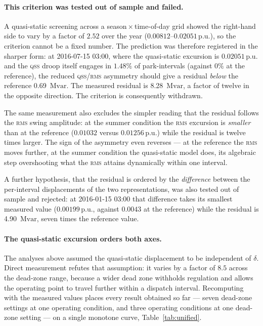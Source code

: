 \documentclass[11pt,a4paper]{article}
\newcommand{\pu}{\ensuremath{\mathrm{p.u.}}}
\newcommand{\Mvar}{\ensuremath{\mathrm{Mvar}}}
\newcommand{\qss}{\textsc{qss}}
\newcommand{\rms}{\textsc{rms}}
\begin{document}
\paragraph{This criterion was tested out of sample and failed.} A
quasi-static screening across a season\,$\times$\,time-of-day grid showed the
right-hand side to vary by a factor of $2.52$ over the year
($0.00812$--$0.02051\,\pu$), so the criterion cannot be a fixed number. The
prediction was therefore registered in the sharper form: at
2016-07-15 03:00, where the quasi-static excursion is $0.02051\,\pu$ and the
\qss{} droop itself engages in $1.48\%$ of park-intervals (against $0\%$ at
the reference), the reduced \qss/\rms{} asymmetry should give a residual
\emph{below} the reference \SI{0.69}{\Mvar}. The measured residual is
\SI{8.28}{\Mvar}, a factor of twelve in the opposite direction. The criterion
is consequently withdrawn.

The same measurement also excludes the simpler reading that the residual
follows the \rms{} swing amplitude: at the summer condition the \rms{}
excursion is \emph{smaller} than at the reference ($0.01032$ versus
$0.01256\,\pu$) while the residual is twelve times larger. The sign of the
asymmetry even reverses --- at the reference the \rms{} moves further, at the
summer condition the quasi-static model does, its algebraic step overshooting
what the \rms{} attains dynamically within one interval.

A further hypothesis, that the residual is ordered by the \emph{difference}
between the per-interval displacements of the two representations, was also
tested out of sample and rejected: at 2016-01-15 03:00 that difference takes
its smallest measured value ($0.00199\,\pu$, against $0.0043$ at the
reference) while the residual is \SI{4.90}{\Mvar}, seven times the reference
value.

\paragraph{The quasi-static excursion orders both axes.} The analyses above
assumed the quasi-static displacement to be independent of $\delta$. Direct
measurement refutes that assumption: it varies by a factor of $8.5$ across
the dead-zone range, because a wider dead zone withholds regulation and
allows the operating point to travel further within a dispatch interval.
Recomputing with the measured values places every result obtained so far ---
seven dead-zone settings at one operating condition, and three operating
conditions at one dead-zone setting --- on a single monotone curve,
Table~\ref{tab:unified}.
\end{document}
